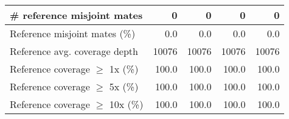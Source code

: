 \documentclass[12pt,a4paper]{article}
\begin{document}
\begin{table}[ht]
\begin{center}
\begin{tabular}{|l*{4}{|r}|}
\# reference misjoint mates & 0 & 0 & 0 & 0 \\ \hline
Reference misjoint mates (\%) & 0.0 & 0.0 & 0.0 & 0.0 \\ \hline
Reference avg. coverage depth & 10076 & 10076 & 10076 & 10076 \\ \hline
Reference coverage $\geq$ 1x (\%) & 100.0 & 100.0 & 100.0 & 100.0 \\ \hline
Reference coverage $\geq$ 5x (\%) & 100.0 & 100.0 & 100.0 & 100.0 \\ \hline
Reference coverage $\geq$ 10x (\%) & 100.0 & 100.0 & 100.0 & 100.0 \\ \hline
\end{tabular}
\end{center}
\end{table}
\end{document}
